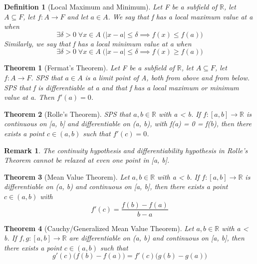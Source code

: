 \documentclass[11pt, oneside]{book}
\theoremstyle{break}
\newtheorem{thm}{Theorem}[section]
\newtheorem*{remark}{Remark}
\newtheorem{defn}{Definition}[section]
\newcommand{\bb}[1]{\mathbb{#1}}			%
\begin{document}
\begin{defn}[Local Maximum and Minimum]
	Let F be a subfield of $\bb{R}$, let $A \subseteq F$, let $f: A \to F$ and let $a \in A$. We say that f has a local maximum value at a when
	\[
		\exists \delta > 0 \; \forall x \in A \; \big(|x-a| \leq \delta \implies f(x) \leq f(a) \big)
	\]
	Similarly, we say that f has a local minimum value at a when
	\[
		\exists \delta > 0 \; \forall x \in A \; \big( |x-a| \leq \delta \implies f(x) \geq f(a) \big)
	\]
\end{defn}

\begin{thm}[Fermat's Theorem]
	Let F be a subfield of $\bb{R}$, let $A \subseteq F$, let $f: A \to F$. SPS that $a \in A$ is a limit point of A, both from above and from below. SPS that f is differentiable at a and that f has a local maximum or minimum value at a. Then $f'(a) = 0$.
\end{thm}

\begin{thm}[Rolle's Theorem]
	SPS that $a, b \in \bb{R}$ with a < b. If $f: [a, b] \to \bb{R}$ is continuous on [a, b] and differentiable on (a, b), with f(a) = 0 = f(b), then there exists a point $c \in (a, b)$ such that $f'(c) = 0$.
\end{thm}

\begin{remark}
	The continuity hypothesis and differentiability hypothesis in Rolle's Theorem cannot be relaxed at even one point in [a, b].
\end{remark}

\begin{thm}[Mean Value Theorem]
	Let $a, b \in \bb{R}$ with a < b. If $f: [a, b] \to \bb{R}$ is differentiable on (a, b) and continuous on [a, b], then there exists a point $c \in (a, b)$ with
	\[
		f'(c) = \frac{f(b) - f(a)}{b - a}
	\]
\end{thm}

\begin{thm}[Cauchy/Generalized Mean Value Theorem]
	Let $a, b \in \bb{R}$ with a < b. If $f, g: [a, b] \to \bb{R}$ are differentiable on (a, b) and continuous on [a, b], then there exists a point $c \in (a, b)$ such that
	\[
		g'(c)\big( f(b) - f(a) \big) = f'(c)\big( g(b) - g(a) \big)
	\]
\end{thm}
\end{document}
